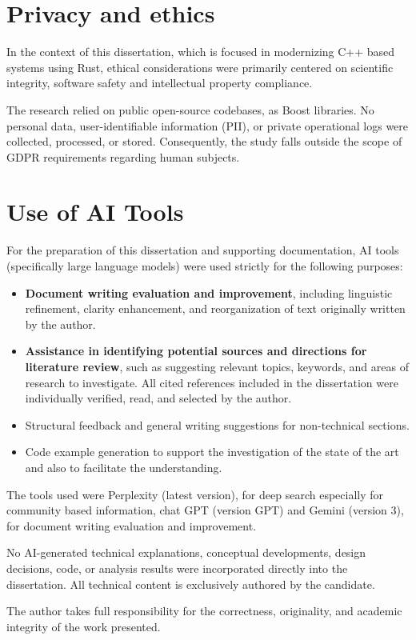 \section{Privacy and ethics}
In the context of this dissertation, which is focused in modernizing C++ based systems using Rust, 
ethical considerations were primarily centered on scientific integrity, software safety and intellectual property compliance.

The research relied on public open-source codebases, as Boost libraries.  No personal data, user-identifiable information (PII), or private operational logs were collected, processed, or stored. 
Consequently, the study falls outside the scope of GDPR requirements regarding human subjects.


\section{Use of AI Tools}
\label{sec:ai_tools}

For the preparation of this dissertation and supporting documentation, 
AI tools (specifically large language models) were used strictly for the following purposes:
\begin{itemize}
    \item \textbf{Document writing evaluation and improvement}, including linguistic refinement, clarity enhancement, and reorganization of text originally written by the author.
    \item \textbf{Assistance in identifying potential sources and directions for literature review}, such as suggesting relevant topics, keywords, and areas of research to investigate. All cited references included in the dissertation were individually verified, read, and selected by the author.
    \item Structural feedback and general writing suggestions for non-technical sections.
    \item Code example generation to support the investigation of the state of the art and also to facilitate the understanding.
\end{itemize}

The tools used were Perplexity (latest version), for deep search especially for community based information, 
chat GPT (version GPT) and Gemini (version 3), for document writing evaluation and improvement.

No AI-generated technical explanations, conceptual developments, design decisions, code, 
or analysis results were incorporated directly into the dissertation. 
All technical content is exclusively authored by the candidate.

The author takes full responsibility for the correctness, originality, and academic integrity of the work presented.
